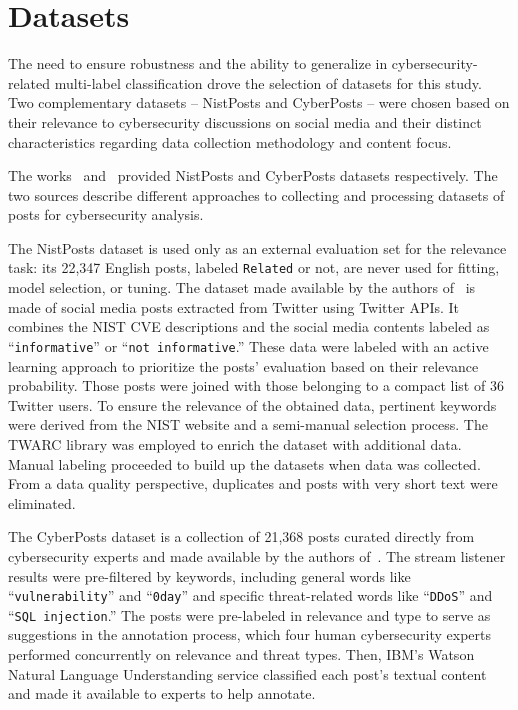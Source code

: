 \section{Datasets}\label{sec:datasets-mtd}
The need to ensure robustness and the ability to generalize in cybersecurity-related multi-label classification drove the selection of datasets for this study. Two complementary datasets -- NistPosts and CyberPosts -- were chosen based on their relevance to cybersecurity discussions on social media and their distinct characteristics regarding data collection methodology and content focus.

The works~\cite{cotov2023} and~\cite{behzadan2018} provided NistPosts and CyberPosts datasets respectively. The two sources describe different approaches to collecting and processing datasets of posts for cybersecurity analysis.

The NistPosts dataset is used only as an external evaluation set for the relevance task: its 22,347 English posts, labeled \texttt{Related} or not, are never used for fitting, model selection, or tuning. The dataset made available by the authors of~\cite{cotov2023} is made of social media posts extracted from Twitter using Twitter APIs. It combines the NIST CVE descriptions and the social media contents labeled as ``\texttt{informative}'' or ``\texttt{not informative}.'' These data were labeled with an active learning approach to prioritize the posts' evaluation based on their relevance probability. Those posts were joined with those belonging to a compact list of 36 Twitter users. To ensure the relevance of the obtained data, pertinent keywords were derived from the NIST website and a semi-manual selection process. The TWARC library was employed to enrich the dataset with additional data. Manual labeling proceeded to build up the datasets when data was collected. From a data quality perspective, duplicates and posts with very short text were eliminated.

The CyberPosts dataset is a collection of 21,368 posts curated directly from cybersecurity experts and made available by the authors of~\cite{behzadan2018}. The stream listener results were pre-filtered by keywords, including general words like ``\texttt{vulnerability}'' and ``\texttt{0day}'' and specific threat-related words like ``\texttt{DDoS}'' and ``\texttt{SQL injection}.'' The posts were pre-labeled in relevance and type to serve as suggestions in the annotation process, which four human cybersecurity experts performed concurrently on relevance and threat types. Then, IBM's Watson Natural Language Understanding service classified each post's textual content and made it available to experts to help annotate.

